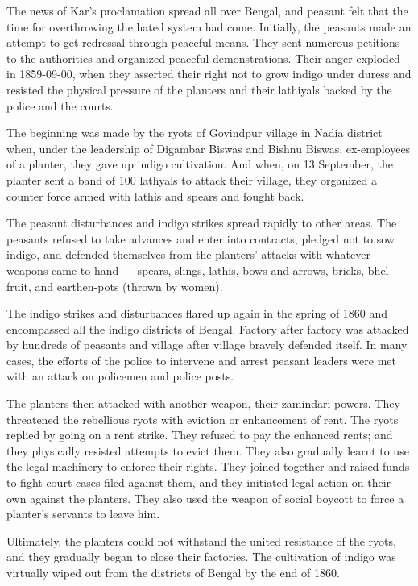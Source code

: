 \begin{multicols}{2}
The news of Kar's proclamation spread all over Bengal, and peasant felt that the time for overthrowing the hated system had come. Initially, the peasants made an attempt to get redressal through peaceful means. They sent numerous petitions to the authorities and organized peaceful demonstrations. Their anger exploded in 1859-09-00, when they asserted their right not to grow indigo under duress and resisted the physical pressure of the planters and their lathiyals backed by the police and the courts.

The beginning was made by the ryots of Govindpur village in Nadia district when, under the leadership of Digambar Biswas and Bishnu Biswas, ex-employees of a planter, they gave up indigo cultivation. And when, on 13 September, the planter sent a band of 100 lathyals to attack their village, they organized a counter force armed with lathis and spears and fought back.

The peasant disturbances and indigo strikes spread rapidly to other areas. The peasants refused to take advances and enter into contracts, pledged not to sow indigo, and defended themselves from the planters' attacks with whatever weapons came to hand --- spears, slings, lathis, bows and arrows, bricks, bhel-fruit, and earthen-pots (thrown by women).

The indigo strikes and disturbances flared up again in the spring of 1860 and encompassed all the indigo districts of Bengal. Factory after factory was attacked by hundreds of peasants and village after village bravely defended itself. In many cases, the efforts of the police to intervene and arrest peasant leaders were met with an attack on policemen and police posts.

The planters then attacked with another weapon, their zamindari powers. They threatened the rebellious ryots with eviction or enhancement of rent. The ryots replied by going on a rent strike. They refused to pay the enhanced rents; and they physically resisted attempts to evict them. They also gradually learnt to use the legal machinery to enforce their rights. They joined together and raised funds to fight court cases filed against them, and they initiated legal action on their own against the planters. They also used the weapon of social boycott to force a planter's servants to leave him.

Ultimately, the planters could not withstand the united resistance of the ryots, and they gradually began to close their factories. The cultivation of indigo was virtually wiped out from the districts of Bengal by the end of 1860.


\end{multicols}
